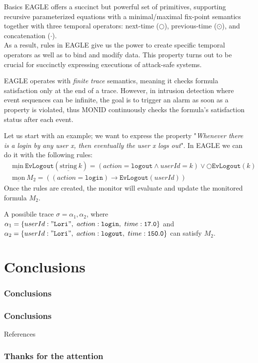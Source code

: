 \documentclass[aspectratio=169,t,xcolor=table]{beamer}
\begin{document}
\begin{frame}[allowframebreaks]{Basics}
    EAGLE offers a succinct but powerful set of primitives, supporting recursive parameterized equations with a minimal/maximal fix-point semantics together with three temporal operators: next-time ($\bigcirc$), previous-time ($\odot$), and concatenation ($\cdot$).\\
    \vspace{2.5mm}
    As a result, rules in EAGLE give us the power to create specific temporal operators as well as to bind and modify data. This property turns out to be crucial for succinctly expressing executions of attack-safe systems.

    \vspace{2.5mm}
    EAGLE operates with \textit{finite trace} semantics, meaning it checks formula satisfaction only at the end of a trace. However, in intrusion detection where event sequences can be infinite, the goal is to trigger an alarm as soon as a property is violated, thus MONID continuously checks the formula's satisfaction status after each event.

    Let us start with an example; we want to express the property "\textit{Whenever there is a login by any user x, then eventually the user x logs out}". In EAGLE we can do it with the following rules:
    \begin{align*}
        & \underline{\text{min}}\ \mathtt{EvLogout}(\underline{\text{string}}\ k) = (action = \mathtt{logout}\land userId = k) \lor \bigcirc \mathtt{EvLogout}(k) \\
        & \underline{\text{mon}}\ M_2 = ((action = \mathtt{login})\rightarrow \mathtt{EvLogout}(userId)) 
    \end{align*}
    Once the rules are created, the monitor will evaluate and update the monitored formula $M_2$. 
    \vspace{2.5mm}

    A possibile trace $\sigma=\alpha_1,\alpha_2$, where $\alpha_1=\{userId:\mathtt{"Lori"},\ action:\mathtt{login},\ time:\mathtt{17.0}\}$ and $\alpha_2=\{userId:\mathtt{"Lori"},\ action:\mathtt{logout},\ time:\mathtt{150.0}\}$ can satisfy $M_2$.
\end{frame}



\section{Conclusions}
\begin{frame}{}
    \frametitle{Conclusions}
\end{frame}


\begin{frame}
    \frametitle{Conclusions}

\end{frame}

\begin{frame}[allowframebreaks]{References}
    \nocite{*} 
    \printbibliography
\end{frame}

\begin{frame}{}
    \frametitle{Thanks for the attention}
\end{frame}
\end{document}

